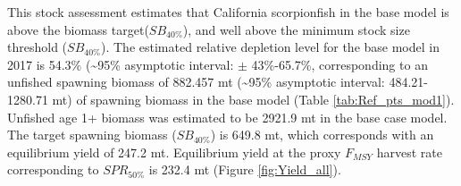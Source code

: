 \documentclass[12pt,]{article}
\begin{document}
This stock assessment estimates that California scorpionfish in the base
model is above the biomass target(\(SB_{40\%}\)), and well above the
minimum stock size threshold (\(SB_{40\%}\)). The estimated relative
depletion level for the base model in 2017 is 54.3\%
(\textasciitilde{}95\% asymptotic interval: \(\pm\) 43\%-65.7\%,
corresponding to an unfished spawning biomass of 882.457 mt
(\textasciitilde{}95\% asymptotic interval: 484.21-1280.71 mt) of
spawning biomass in the base model (Table \ref{tab:Ref_pts_mod1}).
Unfished age 1+ biomass was estimated to be 2921.9 mt in the base case
model. The target spawning biomass (\(SB_{40\%}\)) is 649.8 mt, which
corresponds with an equilibrium yield of 247.2 mt. Equilibrium yield at
the proxy \(F_{MSY}\) harvest rate corresponding to \(SPR_{50\%}\) is
232.4 mt (Figure \ref{fig:Yield_all}).

\FloatBarrier
\end{document}
